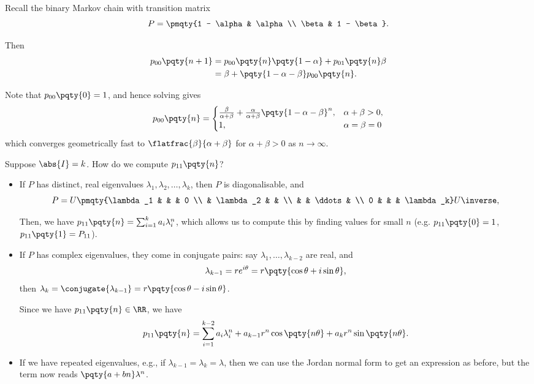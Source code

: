 \begin{example}
    Recall the binary Markov chain with transition matrix
    \[
        P = \pmqty{1 - \alpha & \alpha \\ \beta & 1 - \beta}.
    \]

    Then
    \begin{align*}
        p_{00} \pqty{n + 1} &= p_{00} \pqty{n} \pqty{1 - \alpha} + p_{01} \pqty{n} \beta \\
        &= \beta + \pqty{1 - \alpha - \beta} p_{00} \pqty{n}.
    \end{align*}

    Note that \(p_{00} \pqty{0} = 1\), and hence solving gives
    \[
        p_{00} \pqty{n} = \begin{cases}
            \frac{\beta}{\alpha + \beta} + \frac{\alpha}{\alpha + \beta} \pqty{1 - \alpha - \beta}^n, & \alpha + \beta > 0, \\
            1, & \alpha = \beta = 0
        \end{cases}
    \]
    which converges geometrically fast to \(\flatfrac{\beta}{\alpha + \beta}\) for \(\alpha + \beta > 0\) as \(n \to \infty\).
\end{example}

Suppose \(\abs{I} = k\). How do we compute \(p_{11}\pqty{n}\)?

\begin{itemize}
    \item If \(P\) has distinct, real eigenvalues \(\lambda_1, \lambda_2, \ldots, \lambda_k\), then \(P\) is diagonalisable, and
    \[
        P = U \pmqty{\lambda_1 & & & 0 \\ & \lambda_2 & & \\ & & \ddots & \\ 0 & & & \lambda_k} U\inverse,
    \]

    Then, we have \(p_{11}\pqty{n} = \sum_{i = 1}^k a_i \lambda_i^n\), which allows us to compute this by finding values for small \(n\) (e.g. \(p_{11} \pqty{0} = 1\), \(p_{11} \pqty{1} = P_{11}\)).

    \item If \(P\) has complex eigenvalues, they come in conjugate pairs: say \(\lambda_1, \ldots, \lambda_{k - 2}\) are real, and
    \[
        \lambda_{k - 1} = r e^{i \theta} = r \pqty{\cos \theta + i \sin \theta},
    \]
    then \(\lambda_k = \conjugate{\lambda_{k - 1}} = r \pqty{\cos \theta - i \sin \theta}\).

    Since we have \(p_{11} \pqty{n} \in \RR\), we have
    \[
        p_{11} \pqty{n} = \sum_{i = 1}^{k - 2} a_i \lambda_i^n + a_{k - 1} r^n \cos \pqty{n \theta} + a_k r^n \sin \pqty{n \theta}.
    \]

    \item If we have repeated eigenvalues, e.g., if \(\lambda_{k - 1} = \lambda_{k} = \lambda\), then we can use the Jordan normal form to get an expression as before, but the term now reads \(\pqty{a + bn} \lambda^ n\).
\end{itemize}

